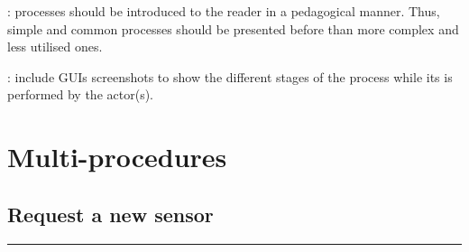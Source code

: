 : processes should be introduced to the
reader in a pedagogical manner. Thus, simple and common processes should be presented before
than more complex and less utilised ones.

: include GUIs screenshots to show the
different stages of the process while its is performed by the actor(s).






\section{Multi-procedures}

\subsection{Request a new sensor}
\vspace{0.5cm}
\hfill
\hrule
